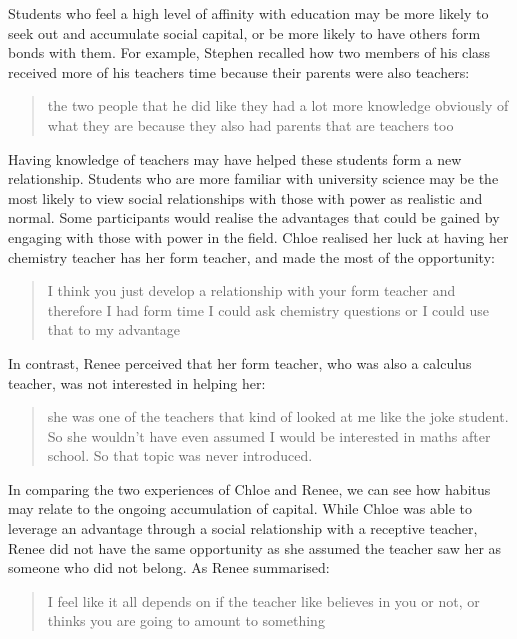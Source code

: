 Students who feel a high level of affinity with education may be more likely to seek out and accumulate social capital, or be more likely to have others form bonds with them. For example, Stephen recalled how two members of his class received more of his teachers time because their parents were also teachers: \blockquote{the two people that he did like they had a lot more knowledge obviously of what they are because they also had parents that are teachers too}. Having knowledge of teachers may have helped these students form a new relationship. Students who are more familiar with university science may be the most likely to view social relationships with those with power as realistic and normal. Some participants would realise the advantages that could be gained by engaging with those with power in the field. Chloe realised her luck at having her chemistry teacher has her form teacher, and made the most of the opportunity: \blockquote{I think you just develop a relationship with your form teacher and therefore I had form time I could ask chemistry questions or I could use that to my advantage}. In contrast, Renee perceived that her form teacher, who was also a calculus teacher, was not interested in helping her: \blockquote{she was one of the teachers that kind of looked at me like the joke student. So she wouldn't have even assumed I would be interested in maths after school. So that topic was never introduced.} In comparing the two experiences of Chloe and Renee, we can see how habitus may relate to the ongoing accumulation of capital. While Chloe was able to leverage an advantage through a social relationship with a receptive teacher, Renee did not have the same opportunity as she assumed the teacher saw her as someone who did not belong. As Renee summarised: \blockquote{I feel like it all depends on if the teacher like believes in you or not, or thinks you are going to amount to something}.

